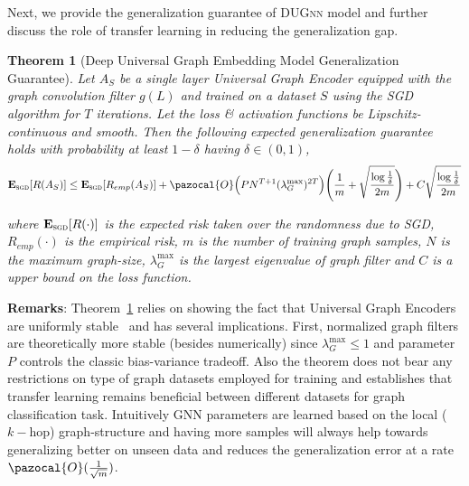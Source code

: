 \documentclass{article}
\newtheorem{theorem}{Theorem}
\newcommand{\BigO}{\pazocal{O}}
\begin{document}
Next, we provide the generalization guarantee of  \textsc{DUGnn} model and further discuss  the role of transfer learning in   reducing the generalization gap.
\begin{theorem}[Deep Universal Graph Embedding Model Generalization Guarantee]\label{thm:gcnn_gen_bound} \textit{Let $A_S$ be a  single layer Universal Graph Encoder        equipped with the graph convolution filter $g(L)$  and trained on a dataset  $S$  using  the SGD algorithm for $T$ iterations. Let the loss \& activation functions be Lipschitz-continuous and smooth. Then the  following expected generalization guarantee   holds with probability at least  $1 -\delta $ having $\delta \in (0,1)  $,}
\vspace{-0.5em} 	
	\begin{equation*} 	
	\begin{split}
\mathbf{E}_{\textsc{sgd}}[R(A_S) ] &  \leq  \mathbf{E}_{\textsc{sgd}}[R_{emp}(A_S)] +  \BigO \Big( P  N^{T+1}(\lambda_{G}^{\max})^{2T}\Big) \Bigg(\frac{1}{m} + \sqrt{\frac{\log \frac{1}{\delta}}{2m}}\Bigg) + C\sqrt{\frac{\log \frac{1}{\delta}}{2m}} \\
\end{split}	 
	\end{equation*} 
	\vspace{-0.5em}
	
	where   $\mathbf{E}_{\textsc{sgd}}[R(\cdot)]$ is the expected risk taken over   the randomness due to SGD,   $R_{emp}(\cdot)$ is the empirical risk, $m$ is the number of training graph samples, $N$ is the maximum graph-size, $\lambda_{G}^{\max}$ is the largest eigenvalue of graph filter  and $C$  is a upper bound on the loss function.
\end{theorem} 
\vspace{-0.5em}
\noindent\textbf{{Remarks}}: Theorem~\ref{thm:gcnn_gen_bound} relies on showing the fact that Universal Graph Encoders are uniformly stable~\cite{bousquet2002stability} and  has several implications. First, normalized graph filters   are   theoretically more stable (besides numerically) since  $\lambda_{G}^{\max} \leq 1$ and parameter $P$ controls the classic bias-variance tradeoff.  Also the theorem   does not bear any restrictions on type of graph datasets employed for training and establishes that transfer learning remains beneficial between different datasets for graph classification task. Intuitively GNN parameters are learned based  on   the local ($k-$hop) graph-structure and having more samples will always help   towards generalizing better on unseen data and    reduces the generalization error at a rate $\BigO(\frac{1}{\sqrt{m}})$.
\end{document}
